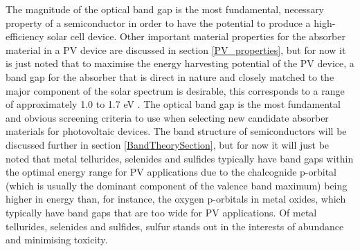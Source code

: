 \documentclass[11pt, twoside]{report}
\begin{document}
The magnitude of the optical band gap is the most fundamental, necessary property of a semiconductor in order to have the potential to produce a high-efficiency solar cell device. Other important material properties for the absorber material in a PV device are discussed in section \ref{PV_properties}, but for now it is just noted that to maximise the energy harvesting potential of the PV device, a band gap for the absorber that is direct in nature and closely matched to the major component of the solar spectrum is desirable, this corresponds to a range of approximately 1.0 to 1.7 eV \cite{PV_E_range}. The optical band gap is the most fundamental and obvious screening criteria to use when selecting new candidate absorber materials for photovoltaic devices. The band structure of semiconductors will be discussed further in section \ref{BandTheorySection}, but for now it will just be noted that metal tellurides, selenides and sulfides typically have band gaps within the optimal energy range for PV applications due to the chalcognide p-orbital (which is usually the dominant component of the valence band maximum) being higher in energy than, for instance, the oxygen p-orbitals in metal oxides, which typically have band gaps that are too wide for PV applications. Of metal tellurides, selenides and sulfides, sulfur stands out in the interests of abundance and minimising toxicity.
\end{document}
